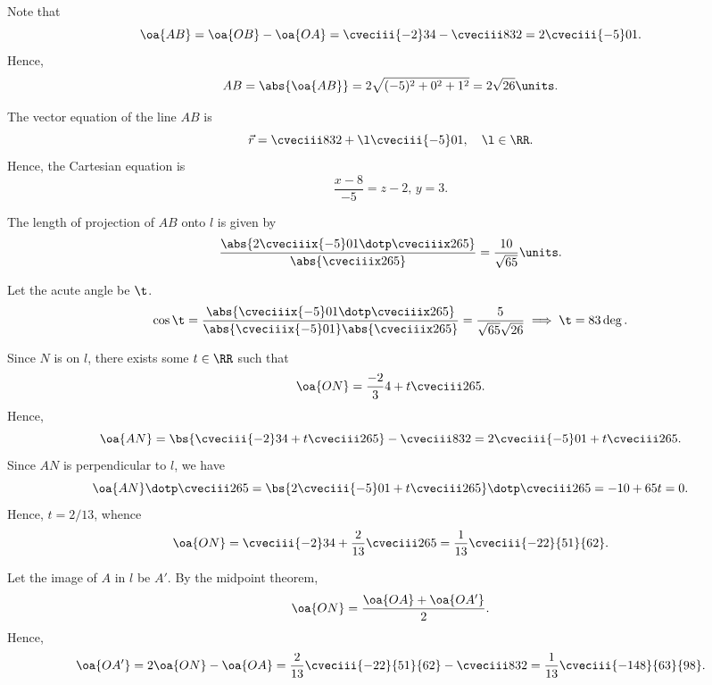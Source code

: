 \begin{solution}
    \begin{ppart}
        Note that \[\oa{AB} = \oa{OB} - \oa{OA} = \cveciii{-2}34 - \cveciii832 = 2\cveciii{-5}01.\] Hence, \[AB = \abs{\oa{AB}} = 2\sqrt{(-5)^2 + 0^2 + 1^2} = 2\sqrt{26} \units.\]
    \end{ppart}
    \begin{ppart}
        The vector equation of the line $AB$ is \[\vec r = \cveciii832 + \l \cveciii{-5}01, \quad \l \in \RR.\] Hence, the Cartesian equation is \[\frac{x-8}{-5} = z-2, \, y = 3.\]
    \end{ppart}
    \begin{ppart}
        The length of projection of $AB$ onto $l$ is given by \[\frac{\abs{2\cveciiix{-5}01 \dotp \cveciiix265}}{\abs{\cveciiix265}} = \frac{10}{\sqrt{65}} \units.\]
    \end{ppart}
    \begin{ppart}
        Let the acute angle be $\t$. \[\cos \t = \frac{\abs{\cveciiix{-5}01 \dotp \cveciiix265}}{\abs{\cveciiix{-5}01} \abs{\cveciiix265}} = \frac{5}{\sqrt{65} \sqrt{26}} \implies \t = 83 \deg.\]
    \end{ppart}
    \begin{ppart}
        Since $N$ is on $l$, there exists some $t \in \RR$ such that \[\oa{ON} = \frac{-2}34 + t \cveciii265.\] Hence, \[\oa{AN} = \bs{\cveciii{-2}34 + t \cveciii265} - \cveciii832 = 2\cveciii{-5}01 + t\cveciii265.\] Since $AN$ is perpendicular to $l$, we have \[\oa{AN} \dotp \cveciii265 = \bs{2\cveciii{-5}01 + t\cveciii265} \dotp \cveciii265 = -10 + 65 t = 0.\] Hence, $t = 2/13$, whence \[\oa{ON} = \cveciii{-2}34 + \frac2{13} \cveciii265 = \frac1{13} \cveciii{-22}{51}{62}.\]

        Let the image of $A$ in $l$ be $A'$. By the midpoint theorem, \[\oa{ON} = \frac{\oa{OA} + \oa{OA'}}{2}.\] Hence, \[\oa{OA'} = 2\oa{ON} - \oa{OA} = \frac2{13} \cveciii{-22}{51}{62} - \cveciii832 = \frac1{13} \cveciii{-148}{63}{98}.\]
    \end{ppart}
\end{solution}

